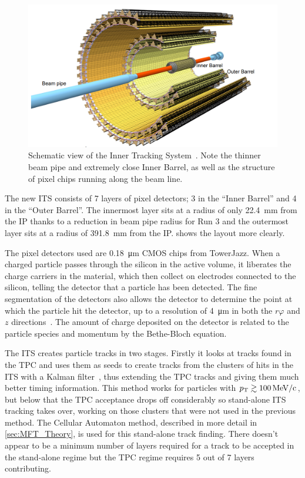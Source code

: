 \begin{figure}[h]
    \begin{center}
        \includegraphics[width=.8\textwidth]{Figs/ITS_Schematic.png}
        \caption[Schematic view of the Inner Tracking System]{Schematic view of the Inner Tracking System~\cite{ITS_Upgrade_TDR}. Note the thinner beam pipe and extremely close Inner Barrel, as well as the structure of pixel chips running along the beam line.}
        \label{fig:ITS_Schematic}
    \end{center}
\end{figure}

The new ITS consists of 7 layers of pixel detectors; 3 in the ``Inner Barrel'' and 4 in the ``Outer Barrel''. The innermost layer sits at a radius of only \SI{22.4}{\milli\metre} from the IP thanks to a reduction in beam pipe radius for Run 3 and the outermost layer sits at a radius of \SI{391.8}{\milli\metre} from the IP.  shows the layout more clearly. 

The pixel detectors used are \SI{0.18}{\micro\metre} CMOS chips from TowerJazz. When a charged particle passes through the silicon in the active volume, it liberates the charge carriers in the material, which then collect on electrodes connected to the silicon, telling the detector that a particle has been detected. The fine segmentation of the detectors also allows the detector to determine the point at which the particle hit the detector, up to a resolution of \SI{4}{\micro\metre} in both the $r\varphi$ and $z$ directions~\cite{ITS_Upgrade_TDR}. The amount of charge deposited on the detector is related to the particle species and momentum by the Bethe-Bloch equation. 

The ITS creates particle tracks in two stages. Firstly it looks at tracks found in the TPC and uses them as seeds to create tracks from the clusters of hits in the ITS with a Kalman filter~\cite{Kalman}, thus extending the TPC tracks and giving them much better timing information. This method works for particles with $p_\mathrm{T}\gtrsim\SI{100}{\mega\electronvolt\per c}$, but below that the TPC acceptance drops off considerably so stand-alone ITS tracking takes over, working on those clusters that were not used in the previous method. The Cellular Automaton method, described in more detail in \cref{sec:MFT_Theory}, is used for this stand-alone track finding. There doesn't appear to be a minimum number of layers required for a track to be accepted in the stand-alone regime but the TPC regime requires 5 out of 7 layers contributing.


